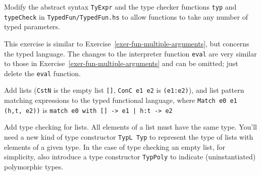 \documentclass[a4paper]{article}
\begin{document}
\begin{exercise}\label{exer-fun-multiple-arguments-typed} 
  Modify the abstract syntax \texttt{TyExpr} and the type checker
  functions \texttt{typ} and \texttt{typeCheck} in
  \texttt{TypedFun/TypedFun.hs} to allow functions to take any number
  of typed parameters.  
  
  This exercise is similar to
  Exercise~\ref{exer-fun-multiple-arguments}, but concerns the typed
  language.  The changes to the interpreter function \texttt{eval} are
  very similar to those in Exercise~\ref{exer-fun-multiple-arguments}
  and can be omitted; just delete the \texttt{eval} function.\\
  

\end{exercise}


\begin{exercise}
  Add lists (\texttt{CstN} is the empty list \texttt{[]},
  \texttt{ConC e1 e2} is \texttt{(e1:e2)}), and list pattern matching
  expressions to the typed functional language, where
  \texttt{Match e0 e1 (h,t, e2))} is \texttt{match e0 with [] -> e1
    | h:t -> e2}\\


\end{exercise}

\begin{exercise}
  Add type checking for lists.  All elements of a list must have the
  same type.  You'll need a new kind of type constructor \texttt{TypL Typ} to
  represent the type of lists with elements of a given type. In the case of type checking an empty list, for simplicity, also introduce a type constructor \texttt{TypPoly} to indicate (uninstantiated) polymorphic types.\\
  
\end{exercise}
\end{document}
